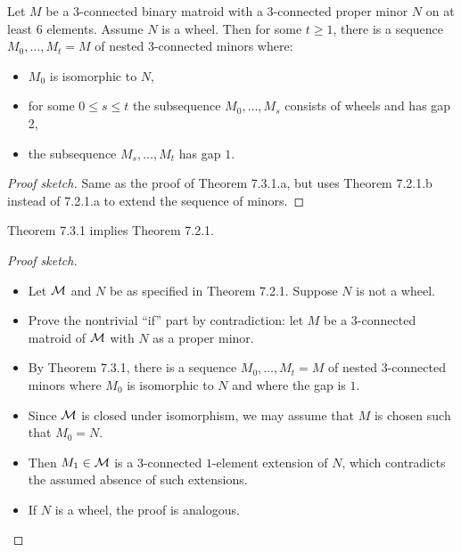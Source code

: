 \begin{theorem}[7.3.1.b]
  \label{thm:7.3.1.b}
  Let $M$ be a $3$-connected binary matroid with a $3$-connected proper minor $N$ on at least $6$ elements. Assume $N$ is a wheel.
  Then for some $t \geq 1$, there is a sequence $M_{0}, \dots, M_{t} = M$ of nested $3$-connected minors where:
  \begin{itemize}
    \item $M_{0}$ is isomorphic to $N$,
    \item for some $0 \leq s \leq t$ the subsequence $M_{0}, \dots, M_{s}$ consists of wheels and has gap 2,
    \item the subsequence $M_{s}, \dots, M_{t}$ has gap $1$.
  \end{itemize}
\end{theorem}

\begin{proof}[Proof sketch]
  Same as the proof of Theorem 7.3.1.a, but uses Theorem 7.2.1.b instead of 7.2.1.a to extend the sequence of minors.
\end{proof}

\begin{proposition}[7.2.1 from 7.3.1]
  \label{prop:7.2.1_from_7.3.1}
  Theorem 7.3.1 implies Theorem 7.2.1.
\end{proposition}

\begin{proof}[Proof sketch]
  \begin{itemize}
    \item Let $\mathcal{M}$ and $N$ be as specified in Theorem 7.2.1. Suppose $N$ is not a wheel.
    \item Prove the nontrivial ``if'' part by contradiction: let $M$ be a $3$-connected matroid of $\mathcal{M}$ with $N$ as a proper minor.
    \item By Theorem 7.3.1, there is a sequence $M_{0}, \dots, M_{t} = M$ of nested $3$-connected minors where $M_{0}$ is isomorphic to $N$ and where the gap is $1$.
    \item Since $\mathcal{M}$ is closed under isomorphism, we may assume that $M$ is chosen such that $M_{0} = N$.
    \item Then $M_{1} \in \mathcal{M}$ is a $3$-connected $1$-element extension of $N$, which contradicts the assumed absence of such extensions.
    \item If $N$ is a wheel, the proof is analogous.
  \end{itemize}
\end{proof}

